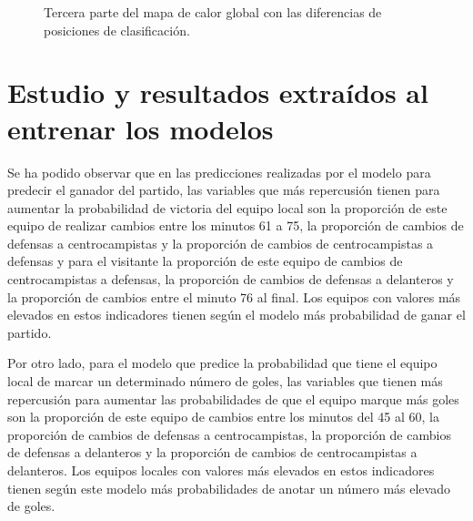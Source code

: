 \begin{figure}[H]
    \centering
    \caption{Tercera parte del mapa de calor global con las diferencias de posiciones de clasificación. }
    \label{fig:tercera-calor}
\end{figure}












\section{Estudio y resultados extraídos al entrenar los modelos}




Se ha podido observar que en las predicciones realizadas por el modelo para predecir el ganador 
del partido, las variables que más repercusión tienen para aumentar la probabilidad de victoria del
equipo local son la proporción de este equipo de realizar cambios entre los minutos 61 a 75, la
proporción de cambios de defensas a centrocampistas y la proporción de cambios de
centrocampistas a defensas y para el visitante la proporción de este equipo de cambios de
centrocampistas a defensas, la proporción de cambios de defensas a delanteros y la proporción de 
cambios entre el minuto 76 al final. Los equipos con valores más elevados en estos indicadores 
tienen según el modelo más probabilidad de ganar el partido.

Por otro lado, para el modelo que predice la probabilidad que tiene el equipo local de marcar un 
determinado número de goles, las variables que tienen más repercusión para aumentar las 
probabilidades de que el equipo marque más goles son la proporción de este equipo de cambios 
entre los minutos del 45 al 60, la proporción de cambios de defensas a centrocampistas, la 
proporción de cambios de defensas a delanteros y la proporción de cambios de centrocampistas a 
delanteros. Los equipos locales con valores más elevados en estos indicadores tienen según este 
modelo más probabilidades de anotar un número más elevado de goles.

